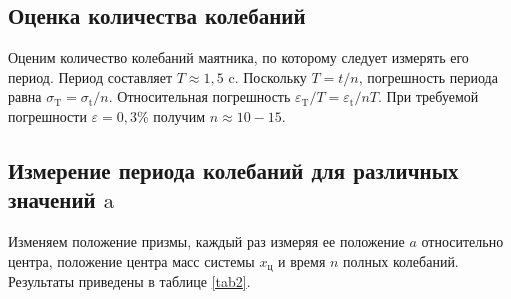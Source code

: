 \documentclass[a4paper,12pt]{article}
\begin{document}
 	\subsection{Оценка количества колебаний}
 	\par Оценим количество колебаний маятника, по которому следует измерять его период. Период составляет $T \approx 1,5\text{ c}$. Поскольку $T = t/n$, погрешность периода равна $\sigma_\text{T} = \sigma_\text{t}/n$. Относительная погрешность $\varepsilon_\text{T}/T = \varepsilon_\text{t}/nT$. При требуемой погрешности $\varepsilon = 0,3\%$ получим $n \approx 10-15$.
 	
 	\subsection{Измерение периода колебаний для различных значений $\text{a}$}
 	
 	Изменяем положение призмы, каждый раз измеряя ее положение $a$ относительно центра, положение центра масс системы $x_\text{ц}$ и время $n$ полных колебаний. Результаты приведены в таблице \ref{tab2}.
 	
\end{document}
